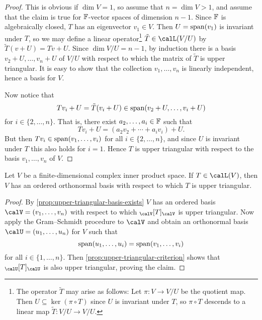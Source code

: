 \begin{proof}
    This is obvious if $\dim V = 1$, so assume that $n = \dim V > 1$, and assume that the claim is true for $\mathbb{F}$-vector spaces of dimension $n-1$. Since $\mathbb{F}$ is algebraically closed, $T$ has an eigenvector $v_1 \in V$. Then $U = \operatorname{span}(v_1)$ is invariant under $T$, so we may define a linear operator\footnote{The operator $\tilde T$ may arise as follows: Let $\pi \colon V \to V/U$ be the quotient map. Then $U \subseteq \ker (\pi \circ T)$ since $U$ is invariant under $T$, so $\pi \circ T$ descends to a linear map $\tilde T \colon V/U \to V/U$.} $\tilde T \in \lin(V/U)$ by $\tilde T(v + U) = Tv + U$. Since $\dim V/U = n-1$, by induction there is a basis $v_2 + U, \ldots, v_n + U$ of $V/U$ with respect to which the matrix of $\tilde T$ is upper triangular. It is easy to show that the collection $v_1, \ldots, v_n$ is linearly independent, hence a basis for $V$.

    Now notice that
    \begin{equation*}
        Tv_i + U
            = \tilde T(v_i + U)
            \in \operatorname{span}(v_2 + U, \ldots, v_i + U)
    \end{equation*}
    for $i \in \{2, \ldots, n\}$. That is, there exist $a_2, \ldots, a_i \in \mathbb{F}$ such that
    \begin{equation*}
        Tv_i + U
            = (a_2 v_2 + \cdots + a_i v_i) + U.
    \end{equation*}
    But then $Tv_i \in \operatorname{span}(v_1, \ldots, v_i)$ for all $i \in \{2, \ldots, n\}$, and since $U$ is invariant under $T$ this also holds for $i = 1$. Hence $T$ is upper triangular with respect to the basis $v_1, \ldots, v_n$ of $V$.
\end{proof}


\begin{theorem}
    Let $V$ be a finite-dimensional complex inner product space. If $T \in \lin(V)$, then $V$ has an ordered orthonormal basis with respect to which $T$ is upper triangular.
\end{theorem}

\begin{proof}
    By \cref{prop:upper-triangular-basis-exists} $V$ has an ordered basis $\calV = (v_1, \ldots, v_n)$ with respect to which $\mr{\calV}{T}{\calV}$ is upper triangular. Now apply the Gram--Schmidt procedure to $\calV$ and obtain an orthonormal basis $\calU = (u_1, \ldots, u_n)$ for $V$ such that
    \begin{equation*}
        \operatorname{span}(u_1, \ldots, u_i)
            = \operatorname{span}(v_1, \ldots, v_i)
    \end{equation*}
    for all $i \in \{1, \ldots, n\}$. Then \cref{prop:upper-triangular-criterion} shows that $\mr{\calU}{T}{\calU}$ is also upper triangular, proving the claim.
\end{proof}